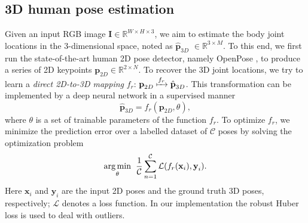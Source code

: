 \documentclass{bmvc2k}
\begin{document}
\subsection{3D human pose estimation \\[-0.1cm]}
Given an input RGB image $\textbf{I} \in \mathbb{R}^{W \times H \times 3}$, we aim to estimate the body joint locations in the 3-dimensional space, noted as $\hat{\textbf{p}}_{3D}$ $\in \mathbb{R}^{3 \times M}$. To this end, we first run the state-of-the-art human 2D pose detector, namely OpenPose \cite{cao2017realtime}, to produce a series of 2D keypoints $\textbf{p}_{2D} \in \mathbb{R}^{2 \times N}$. To recover the 3D joint locations, we try to learn a \textit{direct 2D-to-3D mapping} $f_r$: $\textbf{p}_{2D} \xmapsto{f_r} \hat{\textbf{p}}_{3D}$. This transformation can be implemented by a deep neural network in a supervised manner
\begin{equation}
    \hat{\textbf{p}}_{3D} = f_r(\textbf{p}_{2D}, \theta),
\end{equation}
where $\theta$ is a set of trainable parameters of the function $f_r$. To optimize $f_r$, we minimize the prediction error over a labelled dataset of $\mathcal{C}$ poses by solving the optimization problem
\begin{equation}
   \underset{\theta}{\operatorname{arg\,min}} \hspace{0.2cm}  \frac{1}{\mathcal{C}} \sum_{n=1}^{\mathcal{C}} \mathcal{L} (f_r(\textbf{x}_i), \textbf{y}_i).
\end{equation}
Here $\textbf{x}_i$ and $\textbf{y}_i$ are the input 2D poses and the ground truth 3D poses, respectively; $\mathcal{L}$ denotes a loss function. In our implementation the robust Huber loss \cite{huber1992robust} is used to deal with outliers. \\[-0.7cm]
\end{document}
